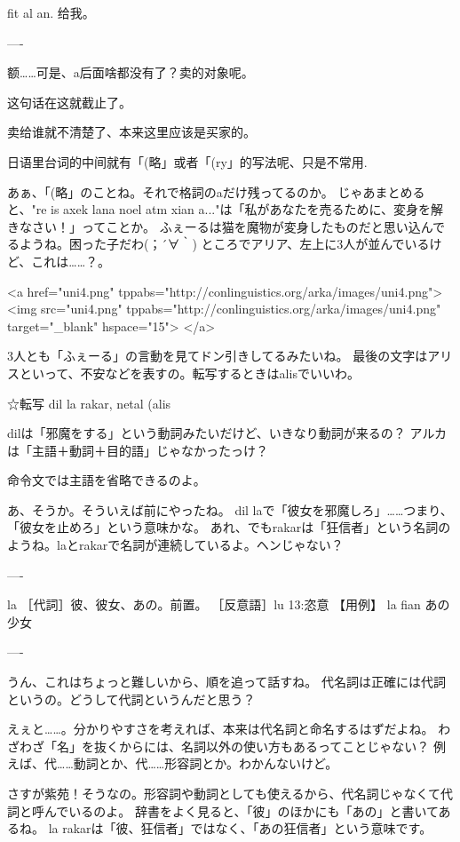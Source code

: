 fit al an. 给我。

----

额……可是、a后面啥都没有了？卖的对象呢。


这句话在这就截止了。

卖给谁就不清楚了、本来这里应该是买家的。

日语里台词的中间就有「(略」或者「(ry」的写法呢、只是不常用.


あぁ、「(略」のことね。それで格詞のaだけ残ってるのか。
じゃあまとめると、"re is axek lana noel atm xian a..."は「私があなたを売るために、変身を解きなさい！」ってことか。
ふぇーるは猫を魔物が変身したものだと思い込んでるようね。困った子だわ(；´∀｀)
ところでアリア、左上に3人が並んでいるけど、これは……？。

<a href="uni4.png" tppabs="http://conlinguistics.org/arka/images/uni4.png">
<img src="uni4.png" tppabs="http://conlinguistics.org/arka/images/uni4.png" target="_blank" hspace="15">
</a>


3人とも「ふぇーる」の言動を見てドン引きしてるみたいね。
最後の文字はアリスといって、不安などを表すの。転写するときはalisでいいわ。

☆転写
dil la rakar, netal (alis


dilは「邪魔をする」という動詞みたいだけど、いきなり動詞が来るの？
アルカは「主語＋動詞＋目的語」じゃなかったっけ？


命令文では主語を省略できるのよ。


あ、そうか。そういえば前にやったね。
dil laで「彼女を邪魔しろ」……つまり、「彼女を止めろ」という意味かな。
あれ、でもrakarは「狂信者」という名詞のようね。laとrakarで名詞が連続しているよ。ヘンじゃない？

----

la
    ［代詞］彼、彼女、あの。前置。
［反意語］lu
13:恣意
【用例】
la fian あの少女

----

うん、これはちょっと難しいから、順を追って話すね。
代名詞は正確には代詞というの。どうして代詞というんだと思う？


えぇと……。分かりやすさを考えれば、本来は代名詞と命名するはずだよね。
わざわざ「名」を抜くからには、名詞以外の使い方もあるってことじゃない？
例えば、代……動詞とか、代……形容詞とか。わかんないけど。


さすが紫苑！そうなの。形容詞や動詞としても使えるから、代名詞じゃなくて代詞と呼んでいるのよ。
辞書をよく見ると、「彼」のほかにも「あの」と書いてあるね。
la rakarは「彼、狂信者」ではなく、「あの狂信者」という意味です。


